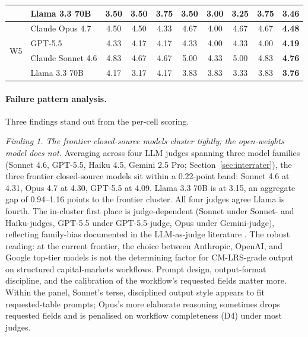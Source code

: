 \documentclass[11pt]{article}
\begin{document}
\begin{table}[h]
\begin{tabular}{@{}llccccccc>{\bfseries}c@{}}
 & Llama 3.3 70B & 3.50 & 3.50 & 3.75 & 3.50 & 3.00 & 3.25 & 3.75 & 3.46 \\
\midrule
\multirow{4}{*}{W5} & Claude Opus 4.7 & 4.50 & 4.50 & 4.33 & 4.67 & 4.00 & 4.67 & 4.67 & 4.48 \\
 & GPT-5.5 & 4.33 & 4.17 & 4.17 & 4.33 & 4.00 & 4.33 & 4.00 & 4.19 \\
 & Claude Sonnet 4.6 & 4.83 & 4.67 & 4.67 & 5.00 & 4.33 & 5.00 & 4.83 & 4.76 \\
 & Llama 3.3 70B & 4.17 & 3.17 & 4.17 & 3.83 & 3.83 & 3.33 & 3.83 & 3.76 \\
\bottomrule
\end{tabular}
\end{table}

\paragraph{Failure pattern analysis.} Three findings stand out from the per-cell scoring.

\textit{Finding 1. The frontier closed-source models cluster tightly; the open-weights model does not.} Averaging across four LLM judges spanning three model families (Sonnet 4.6, GPT-5.5, Haiku 4.5, Gemini 2.5 Pro; Section~\ref{sec:interrater}), the three frontier closed-source models sit within a 0.22-point band: Sonnet 4.6 at 4.31, Opus 4.7 at 4.30, GPT-5.5 at 4.09. Llama 3.3 70B is at 3.15, an aggregate gap of 0.94--1.16 points to the frontier cluster. All four judges agree Llama is fourth. The in-cluster first place is judge-dependent (Sonnet under Sonnet- and Haiku-judges, GPT-5.5 under GPT-5.5-judge, Opus under Gemini-judge), reflecting family-bias documented in the LLM-as-judge literature \citep{zheng2023judging,wang2023llmfair}. The robust reading: at the current frontier, the choice between Anthropic, OpenAI, and Google top-tier models is not the determining factor for CM-LRS-grade output on structured capital-markets workflows. Prompt design, output-format discipline, and the calibration of the workflow's requested fields matter more. Within the panel, Sonnet's terse, disciplined output style appears to fit requested-table prompts; Opus's more elaborate reasoning sometimes drops requested fields and is penalised on workflow completeness (D4) under most judges.
\end{document}
